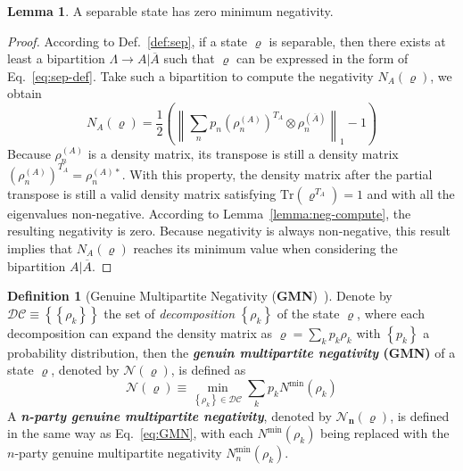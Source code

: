 \documentclass[12font]{article}
\numberwithin{equation}{section}    %
\theoremstyle{definition}
\newtheorem{definition}{Definition}[section]
\newtheorem{lemma}[theorem]{Lemma}
\newcommand{\lr}[1]{\left(  #1  \right)}
\newcommand{\lrg}[1]{\left\{  #1  \right\}}
\newcommand{\mrm}[1]{\mathrm{#1}}
\newcommand{\Tr}{\mrm{Tr}}
\newcommand{\norm}[1]{\left\lVert#1\right\rVert}
\begin{document}
\begin{lemma}\label{lemma:sep-zero-neg}
    A separable state has zero minimum negativity.
\end{lemma}
\begin{proof}
    According to Def.~\ref{def:sep}, if a state $\varrho$ is separable, then there exists at least a bipartition $\Lambda \to A|\overline{A}$ such that $\varrho$ can be expressed in the form of Eq.~\eqref{eq:sep-def}. Take such a bipartition to compute the negativity $N_A(\varrho)$, we obtain
    \[
    N_A(\varrho) = \frac{1}{2}
    \lr{
        \norm{
            \sum_{n} p_n 
            \lr{\rho^{(A)}_n}^{T_A}
            \otimes 
            \rho^{(\overline{A})}_n
        }_1 
        - 
        1
    }
    \]
    Because $\rho^{(A)}_n$ is a density matrix, its transpose is still a density matrix $    \lr{\rho^{(A)}_n}^{T_A}
    =
    \rho^{(A)*}_n$. With this property, the density matrix after the partial transpose is still a valid density matrix satisfying $\Tr\lr{\varrho^{T_A}} = 1$ and with all the eigenvalues non-negative. According to Lemma~\ref{lemma:neg-compute}, the resulting negativity is zero. Because negativity is always non-negative, this result implies that $  N_A(\varrho)  $ reaches its minimum value when considering the bipartition $A|\overline{A}$.
\end{proof}

\begin{definition}[Genuine Multipartite Negativity (\textbf{GMN})~\cite{Lyu-Chandorkar-Kapoor-Takei-Sorensen-Witczak-Krempa_2026}]\label{def:GMN_1}
    Denote by $\mathcal{DC} \equiv \lrg{\lrg{\rho_k}}$ the set of \textit{decomposition} $\lrg{\rho_k}$ of the state $\varrho$, where each decomposition can expand the density matrix as $\varrho = \sum_{k}p_k\rho_k$ with $\lrg{p_k}$ a probability distribution, then the \textbf{\textit{genuin multipartite negativity} (GMN)} of a state $\varrho$, denoted by $\mathcal{N}(\varrho)$, is defined as 
    \begin{equation}\label{eq:GMN}
        \mathcal{N}(\varrho) \equiv \min_{\lrg{\rho_k} \in \mathcal{DC}} \sum_{k}p_k N^{\mrm{min}}(\rho_k)
    \end{equation}
    A \textbf{\textit{n-party genuine multipartite negativity}}, denoted by $\boldsymbol{\mathcal{N}_n(\varrho)}$, is defined in the same way as Eq.~\eqref{eq:GMN}, with each $N^{\mrm{min}}(\rho_k)$ being replaced with the $n$-party genuine multipartite negativity $N^{\mrm{min}}_n(\rho_k)$.
\end{definition}
\end{document}

